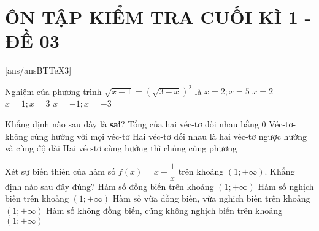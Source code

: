 \section*{ÔN TẬP KIỂM TRA CUỐI KÌ 1 - ĐỀ 03}
\setcounter{ex}{0}\setcounter{bt}{0}
[ans/ansBTTeX3]

\begin{ex}%
Nghiệm của phương trình $\sqrt{x-1}=\left(\sqrt{3-x}\right)^2$ là
\choice
{$x=2;x=5$}
{\True $x=2$}
{$x=1;x=3$}
{$x=-1;x=-3$}
\end{ex}

\begin{ex}%
Khẳng định nào sau đây là {\bf sai}?
\choice
{\True Tổng của hai véc-tơ đối nhau bằng 0}
{Véc-tơ-không cùng hướng với mọi véc-tơ}
{Hai véc-tơ đối nhau là hai véc-tơ ngược hướng và cùng độ dài}
{Hai véc-tơ cùng hướng thì chúng cùng phương}
\end{ex}

\begin{ex}%
Xét sự biến thiên của hàm số $f(x)=x+\dfrac{1}{x}$ trên khoảng $\left(1;+\infty \right)$. Khẳng định nào sau đây đúng?
\choice
{\True Hàm số đồng biến trên khoảng $\left(1;+\infty \right)$}
{Hàm số nghịch biến trên khoảng $\left(1;+\infty \right)$}
{Hàm số vừa đồng biến, vừa nghịch biến trên khoảng $\left(1;+\infty \right)$}
{Hàm số không đồng biến, cũng không nghịch biến trên khoảng $\left(1;+\infty \right)$}
\end{ex}

